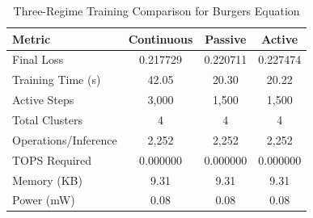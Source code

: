 \begin{table}[htbp]
\centering
\caption{Three-Regime Training Comparison for Burgers Equation}
\label{tab:three_regime_comparison}
\begin{tabular}{l|ccc}
\hline
\textbf{Metric} & \textbf{Continuous} & \textbf{Passive} & \textbf{Active} \\
\hline
Final Loss & 0.217729 & 0.220711 & 0.227474 \\
Training Time (s) & 42.05 & 20.30 & 20.22 \\
Active Steps & 3,000 & 1,500 & 1,500 \\
Total Clusters & 4 & 4 & 4 \\
Operations/Inference & 2,252 & 2,252 & 2,252 \\
TOPS Required & 0.000000 & 0.000000 & 0.000000 \\
Memory (KB) & 9.31 & 9.31 & 9.31 \\
Power (mW) & 0.08 & 0.08 & 0.08 \\
\hline
\end{tabular}
\end{table}
